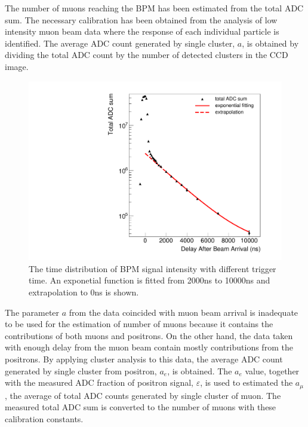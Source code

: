 \documentclass[preprint,3p,twocolumn]{elsarticle}
\begin{document}
The number of muons reaching the BPM has been estimated from the total ADC sum. The necessary calibration has been obtained from the analysis of low intensity muon beam data where the response of each individual particle is identified. The average ADC count generated by single cluster, $a$, is obtained by dividing the total ADC count by the number of detected clusters in the CCD image.
\begin{figure}[bt]
	\begin{minipage}[t]{60mm}
		\includegraphics[width=1.3\textwidth, height=1.3\textwidth]{figure/Decay_v3.pdf}
	\end{minipage}
	\caption{The time distribution of BPM signal intensity with different trigger time. An exponetial function is fitted from 2000ns to 10000ns and extrapolation to 0ns is shown.}
	\label{fig:time_distribution}
\end{figure}

The parameter $a$ from the data coincided with muon beam arrival is inadequate to be used for the estimation of number of muons because it contains the contributions of both muons and positrons. On the other hand, the data taken with enough delay from the muon beam contain mostly contributions from the positrons. By applying cluster analysis to this data, the average ADC count generated by single cluster from positron, $a_e$, is obtained. The $a_e$ value, together with the measured ADC fraction of positron signal, $\varepsilon$, is used to estimated the $a_\mu$, the average of total ADC counts generated by single cluster of muon. The measured total ADC sum is converted to the number of muons with these calibration constants.
\end{document}
